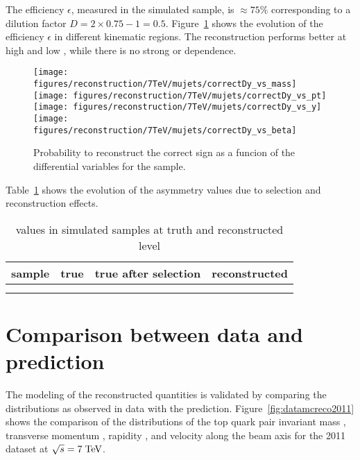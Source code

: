 The efficiency $\epsilon$, measured in the \ttbar{} simulated sample,
is $\approx75\%$ corresponding to a dilution factor
$D=2\times0.75-1=0.5$.
Figure~\ref{fig:dysign} shows the evolution of the efficiency $\epsilon$
in different kinematic regions. The \dy{} reconstruction performs
better at high \mtt{} and low \pttt{}, while there is no strong \ytt{}
or \betatt{} dependence. 

\begin{figure}[!htb]\centering
  \texttt{[image: figures/reconstruction/7TeV/mujets/correctDy\_vs\_mass]}
  \texttt{[image: figures/reconstruction/7TeV/mujets/correctDy\_vs\_pt]}
  \texttt{[image: figures/reconstruction/7TeV/mujets/correctDy\_vs\_y]}
  \texttt{[image: figures/reconstruction/7TeV/mujets/correctDy\_vs\_beta]}
  \caption{
    \label{fig:dysign}
    Probability to reconstruct the correct \dy{} sign as a funcion of
    the differential variables for the \mujets{} sample.
  }
\end{figure}

Table~\ref{tab:actruthreco} shows the evolution of the asymmetry
values due to selection and reconstruction effects.

\begin{table}[!htb]\centering
  \begin{tabular}{ l c c c}
    \toprule
    sample      & true \ac{} & true \ac{} after selection & reconstructed \ac{}\\
    \midrule
    \powheg{} &                &     &    \\
    \mcatnlo{} &                &     &    \\
    \bottomrule
  \end{tabular}
  \caption{\ac{} values in simulated \ttbar{} samples at truth and
    reconstructed level}
  \label{tab:actruthreco}
\end{table}

\section{Comparison between data and prediction}
\label{sec:datamcreco}

The modeling of the reconstructed quantities is validated by comparing
the distributions as observed in data with the prediction. 
Figure~\ref{fig:datamcreco2011} 
shows the comparison of the distributions of
the top quark pair invariant mass \mtt{}, transverse momentum \pttt{},
rapidity \ytt{}, and velocity along the beam axis \betatt{} for the
2011 dataset at $\sqrt{s} = 7 \; \mathrm{TeV}{}$.
                                   
